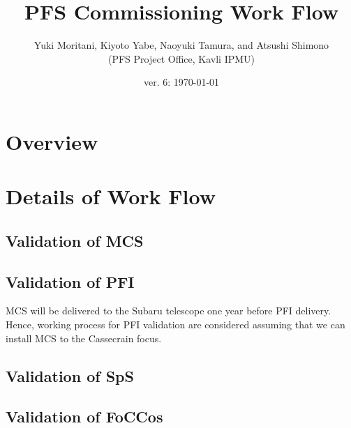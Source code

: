 \documentclass[11pt]{article}
\title{PFS Commissioning Work Flow}
\author{Yuki Moritani, Kiyoto Yabe, Naoyuki Tamura, and Atsushi Shimono \\
(PFS Project Office, Kavli IPMU)}
\date{
ver. 6: \today}
\begin{document}
\maketitle
\tableofcontents

\section{Overview}


\section{Details of Work Flow}

\renewcommand{\thesubsubsection}{M-\;\arabic{subsubsection}}
\subsection{Validation of MCS}\label{sec:MCS}





\renewcommand{\thesubsubsection}{P-\;\arabic{subsubsection}}
\subsection{Validation of PFI}\label{sec:PFI}
MCS will be delivered to the Subaru telescope one year before PFI delivery.
Hence, working process for PFI validation are considered assuming that we can install MCS to the Cassecrain focus.










%
%
%

\renewcommand{\thesubsubsection}{S-\;\arabic{subsubsection}}
\subsection{Validation of SpS}\label{sec:SpS}


%

\renewcommand{\thesubsubsection}{F-\;\arabic{subsubsection}}
\subsection{Validation of FoCCos}\label{sec:FoCCoS}


\end{document}

